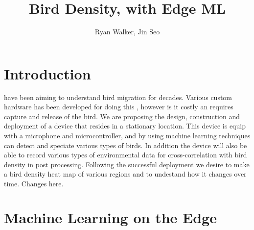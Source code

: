 \documentclass[12pt,journal,compsoc]{IEEEtran}
\begin{document}
\title{Bird Density, with Edge ML}
\author{Ryan Walker, Jin Seo}

\maketitle
\IEEEpeerreviewmaketitle


\section{Introduction}
 have been aiming to understand bird migration for decades. Various custom hardware has been developed for doing this \cite{BirdTracking}, however is it costly an requires capture and release of the bird. We are proposing the design, construction and deployment of a device that resides in a stationary location. This device is equip with a microphone and microcontroller, and by using machine learning techniques \cite{ML1} \cite{ML2} can detect and speciate various types of birds. In addition the device will also be able to record various types of environmental data for cross-correlation with bird density in post processing. Following the successful deployment we desire to make a bird density heat map of various regions and to undestand how it changes over time. Changes here.

\section{Machine Learning on the Edge}
\end{document}
